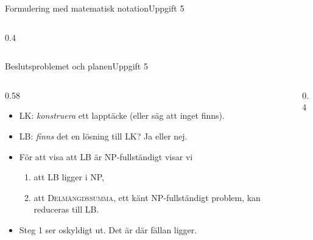 \documentclass[aspectratio=169,10pt]{beamer}
\newcommand{\prob}[1]{\textsc{#1}}
\begin{document}
\begin{frame}{Formulering med matematisk notation}{Uppgift 5}
\begin{columns}[T]
\begin{column}{0.4\textwidth}
    \end{column}
  \end{columns}
\end{frame}

\begin{frame}{Beslutsproblemet och planen}{Uppgift 5}
  \begin{columns}[T]
    \begin{column}{0.58\textwidth}
      \begin{itemize}
        \item<1-> \prob{LK}: \emph{konstruera} ett lapptäcke (eller säg att inget finns).
        \item<1-> \prob{LB}: \emph{finns} det en lösning till \prob{LK}? Ja eller nej.
        \item<2-> För att visa att \prob{LB} är NP-fullständigt visar vi
          \begin{enumerate}
            \item att \prob{LB} ligger i NP,
            \item att \prob{Delmängdssumma}, ett känt NP-fullständigt problem, kan reduceras till \prob{LB}.
          \end{enumerate}
        \item<3-> Steg 1 ser oskyldigt ut. Det är där fällan ligger.
      \end{itemize}
    \end{column}
    \begin{column}{0.4\textwidth}
    \end{column}
  \end{columns}
\end{frame}
\end{document}
